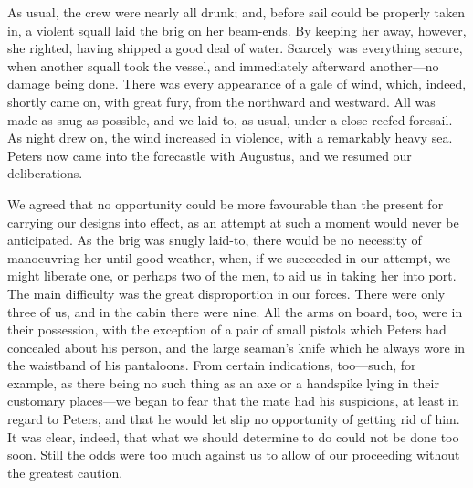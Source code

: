 As usual, the crew were nearly all drunk; and, before sail could be properly
taken in, a violent squall laid the brig on her beam-ends. By keeping her away,
however, she righted, having shipped a good deal of water. Scarcely was
everything secure, when another squall took the vessel, and immediately
afterward another---no damage being done. There was every appearance of a gale
of wind, which, indeed, shortly came on, with great fury, from the northward and
westward. All was made as snug as possible, and we laid-to, as usual, under a
close-reefed foresail. As night drew on, the wind increased in violence, with a
remarkably heavy sea. Peters now came into the forecastle with Augustus, and we
resumed our deliberations. 

We agreed that no opportunity could be more favourable than the present for
carrying our designs into effect, as an attempt at such a moment would never be
anticipated. As the brig was snugly laid-to, there would be no necessity of
manoeuvring her until good weather, when, if we succeeded in our attempt, we
might liberate one, or perhaps two of the men, to aid us in taking her into
port. The main difficulty was the great disproportion in our forces. There were
only three of us, and in the cabin there were nine. All the arms on board, too,
were in their possession, with the exception of a pair of small pistols which
Peters had concealed about his person, and the large seaman's knife which he
always wore in the waistband of his pantaloons. From certain indications,
too---such, for example, as there being no such thing as an axe or a handspike
lying in their customary places---we began to fear that the mate had his
suspicions, at least in regard to Peters, and that he would let slip no
opportunity of getting rid of him. It was clear, indeed, that what we should
determine to do could not be done too soon. Still the odds were too much against
us to allow of our proceeding without the greatest caution. 

